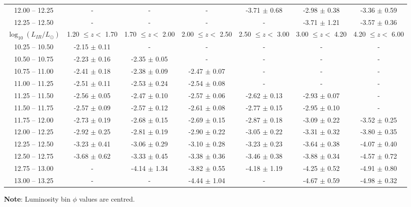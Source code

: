 \begin{table*}
\begin{center}
\begin{tabular}{@{}ccccccc@{}}
        12.00 -- 12.25 & -                & -                & -                & -3.71 $\pm$ 0.68 & -2.98 $\pm$ 0.38 & -3.36 $\pm$ 0.59 \\
        12.25 -- 12.50 & -                & -                & -                & -                & -3.71 $\pm$ 1.21 & -3.57 $\pm$ 0.36 \\
        \hline
        $\log_{10}(L_{IR}/L_{\odot})$ & 1.20 $\leq z <$ 1.70 & 1.70 $\leq z <$ 2.00 & 2.00 $\leq z <$ 2.50 & 2.50 $\leq z <$ 3.00 & 3.00 $\leq z <$ 4.20 & 4.20 $\leq z <$ 6.00  \\
        \hline
        10.25 -- 10.50 & -2.15 $\pm$ 0.11 & - & - & - & - & - \\
        10.50 -- 10.75 & -2.23 $\pm$ 0.16 & -2.35 $\pm$ 0.05 & - & - & - & - \\
        10.75 -- 11.00 & -2.41 $\pm$ 0.18 & -2.38 $\pm$ 0.09 & -2.47 $\pm$ 0.07 & - & - & - \\
        11.00 -- 11.25 & -2.51 $\pm$ 0.11 & -2.53 $\pm$ 0.24 & -2.54 $\pm$ 0.08 & - & - & - \\
        11.25 -- 11.50 & -2.56 $\pm$ 0.05 & -2.47 $\pm$ 0.10 & -2.57 $\pm$ 0.06 & -2.62 $\pm$ 0.13 & -2.93 $\pm$ 0.07 & - \\
        11.50 -- 11.75 & -2.57 $\pm$ 0.09 & -2.57 $\pm$ 0.12 & -2.61 $\pm$ 0.08 & -2.77 $\pm$ 0.15 & -2.95 $\pm$ 0.10 & - \\
        11.75 -- 12.00 & -2.73 $\pm$ 0.19 & -2.68 $\pm$ 0.15 & -2.69 $\pm$ 0.15 & -2.87 $\pm$ 0.18 & -3.09 $\pm$ 0.22 & -3.52 $\pm$ 0.25 \\
        12.00 -- 12.25 & -2.92 $\pm$ 0.25 & -2.81 $\pm$ 0.19 & -2.90 $\pm$ 0.22 & -3.05 $\pm$ 0.22 & -3.31 $\pm$ 0.32 & -3.80 $\pm$ 0.35 \\
        12.25 -- 12.50 & -3.23 $\pm$ 0.41 & -3.06 $\pm$ 0.29 & -3.10 $\pm$ 0.28 & -3.23 $\pm$ 0.23 & -3.64 $\pm$ 0.38 & -4.07 $\pm$ 0.40 \\
        12.50 -- 12.75 & -3.68 $\pm$ 0.62 & -3.33 $\pm$ 0.45 & -3.38 $\pm$ 0.36 & -3.46 $\pm$ 0.38 & -3.88 $\pm$ 0.34 & -4.57 $\pm$ 0.72 \\
        12.75 -- 13.00 & -                & -4.14 $\pm$ 1.34 & -3.82 $\pm$ 0.55 & -4.18 $\pm$ 1.19 & -4.25 $\pm$ 0.52 & -4.91 $\pm$ 0.80 \\
        13.00 -- 13.25 & -                & -                & -4.44 $\pm$ 1.04 & -                & -4.67 $\pm$ 0.59 & -4.98 $\pm$ 0.32 
        \botrule
    \end{tabular}
    \end{center}
    \begin{tabnote}
        {\textbf{Note}: Luminosity bin $\phi$ values are centred.}\tnp
    \end{tabnote}
\end{table*}

